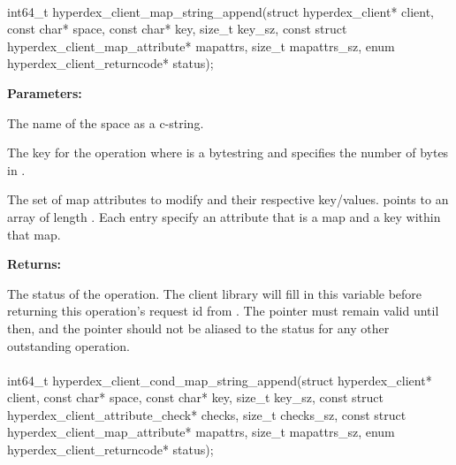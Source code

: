 \paragraph{}
\label{api:c:map_string_append}
\begin{ccode}
int64_t hyperdex_client_map_string_append(struct hyperdex_client* client,
                const char* space,
                const char* key, size_t key_sz,
                const struct hyperdex_client_map_attribute* mapattrs, size_t mapattrs_sz,
                enum hyperdex_client_returncode* status);
\end{ccode}
\funcdesc 

\noindent\textbf{Parameters:}
\begin{description}[labelindent=\widthof{{\code{mapattrs}, \code{mapattrs\_sz}}},leftmargin=*,noitemsep,nolistsep,align=right]
\item[\code{space}] The name of the space as a c-string.
\item[\code{key}, \code{key\_sz}] The key for the operation where  is a bytestring and  specifies the number of bytes in .
\item[\code{mapattrs}, \code{mapattrs\_sz}] The set of map attributes to modify and their respective key/values.   points to an array of length .  Each entry specify an attribute that is a map and a key within that map.
\end{description}

\noindent\textbf{Returns:}
\begin{description}[labelindent=\widthof{{\code{status}}},leftmargin=*,noitemsep,nolistsep,align=right]
\item[\code{status}] The status of the operation.  The client library will fill in this variable before returning this operation's request id from .  The pointer must remain valid until then, and the pointer should not be aliased to the status for any other outstanding operation.
\end{description}

\paragraph{}
\label{api:c:cond_map_string_append}
\begin{ccode}
int64_t hyperdex_client_cond_map_string_append(struct hyperdex_client* client,
                const char* space,
                const char* key, size_t key_sz,
                const struct hyperdex_client_attribute_check* checks, size_t checks_sz,
                const struct hyperdex_client_map_attribute* mapattrs, size_t mapattrs_sz,
                enum hyperdex_client_returncode* status);
\end{ccode}
\funcdesc 

